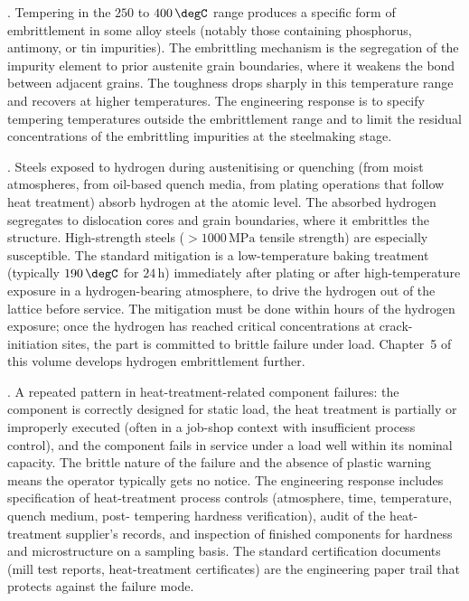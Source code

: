 . Tempering in the
$250$ to $400\,\degC$ range produces a specific form of embrittlement
in some alloy steels (notably those containing phosphorus,
antimony, or tin impurities). The embrittling mechanism is the
segregation of the impurity element to prior austenite grain
boundaries, where it weakens the bond between adjacent grains. The
toughness drops sharply in this temperature range and recovers at
higher temperatures. The engineering response is to specify
tempering temperatures outside the embrittlement range and to limit
the residual concentrations of the embrittling impurities at the
steelmaking stage.

. Steels
exposed to hydrogen during austenitising or quenching (from moist
atmospheres, from oil-based quench media, from plating operations
that follow heat treatment) absorb hydrogen at the atomic level. The
absorbed hydrogen segregates to dislocation cores and grain
boundaries, where it embrittles the structure. High-strength steels
($> 1000\,\text{MPa}$ tensile strength) are especially susceptible.
The standard mitigation is a low-temperature baking treatment
(typically $190\,\degC$ for $24\,\text{h}$) immediately after
plating or after high-temperature exposure in a hydrogen-bearing
atmosphere, to drive the hydrogen out of the lattice before service.
The mitigation must be done within hours of the hydrogen exposure;
once the hydrogen has reached critical concentrations at
crack-initiation sites, the part is committed to brittle failure
under load. Chapter~5 of this volume develops hydrogen embrittlement
further.

. A repeated pattern in heat-treatment-related
component failures: the component is correctly designed for static
load, the heat treatment is partially or improperly executed (often
in a job-shop context with insufficient process control), and the
component fails in service under a load well within its nominal
capacity. The brittle nature of the failure and the absence of
plastic warning means the operator typically gets no notice. The
engineering response includes specification of heat-treatment process
controls (atmosphere, time, temperature, quench medium, post-
tempering hardness verification), audit of the heat-treatment
supplier's records, and inspection of finished components for hardness
and microstructure on a sampling basis. The standard certification
documents (mill test reports, heat-treatment certificates) are the
engineering paper trail that protects against the failure mode.

